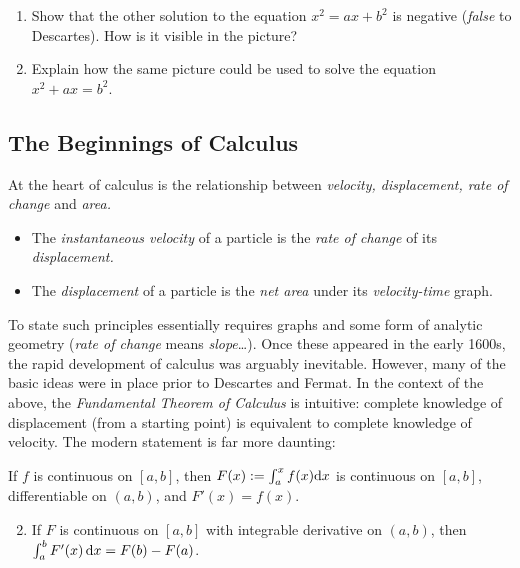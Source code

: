 \begin{exercises}{}{}
\begin{enumerate}
\begin{enumerate}
	  \item Show that the other solution to the equation $x^2=ax+b^2$ is negative (\emph{false} to Descartes). How is it visible in the picture?
  	
	  \item Explain how the same picture could be used to solve the equation $x^2+ax=b^2$.
	\end{enumerate}
\end{enumerate}
\end{exercises}

\clearpage



\subsection{The Beginnings of Calculus}\label{sec:calc1}

At the heart of calculus is the relationship between \emph{velocity, displacement, rate of change} and \emph{area.}
\begin{itemize}\itemsep0pt
  \item The \emph{instantaneous velocity} of a particle is the \emph{rate of change} of its \emph{displacement.}
  \item The \emph{displacement} of a particle is the \emph{net area} under its \emph{velocity-time} graph.
\end{itemize}
To state such principles essentially requires graphs and some form of analytic geometry (\emph{rate of change} means \emph{slope}\ldots). Once these appeared in the early 1600s, the rapid development of calculus was arguably inevitable. However, many of the basic ideas were in place prior to Descartes and Fermat.\smallbreak
In the context of the above, the \emph{Fundamental Theorem of Calculus} is intuitive: complete knowledge of displacement (from a starting point) is equivalent to complete knowledge of velocity. The modern statement is far more daunting:

\begin{thm*}{}{}
\exstart If $f$ is continuous on $[a,b]$, then $F(x):=\int_a^xf(x){\mathrm{d} x}$ is continuous on $[a,b]$, differentiable on $(a,b)$, and $F'(x)=f(x)$.
\begin{enumerate}\setcounter{enumi}{1}
  \item If $F$ is continuous on $[a,b]$ with integrable derivative on $(a,b)$, then $\int_a^bF'(x)\,{\mathrm{d} x}=F(b)-F(a)$.
\end{enumerate}
\end{thm*}

